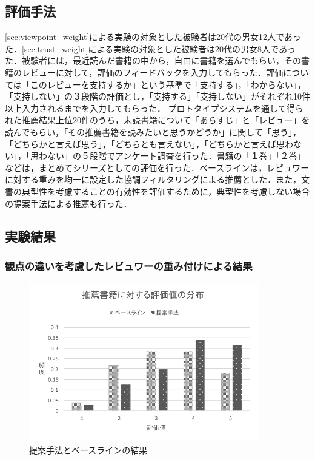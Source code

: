 \documentclass[a4paper,11pt,oneside,openany]{jsbook}
\begin{document}
		\subsection{評価手法}
\ref{sec:viewpoint_weight}による実験の対象とした被験者は20代の男女12人であった．\ref{sec:trust_weight}による実験の対象とした被験者は20代の男女8人であった．被験者には，最近読んだ書籍の中から，自由に書籍を選んでもらい，その書籍のレビューに対して，評価のフィードバックを入力してもらった．評価については「このレビューを支持するか」という基準で「支持する」，「わからない」，「支持しない」の３段階の評価とし，「支持する」「支持しない」がそれぞれ10件以上入力されるまでを入力してもらった．
プロトタイプシステムを通して得られた推薦結果上位20件のうち，未読書籍について「あらすじ」と「レビュー」を読んでもらい，「その推薦書籍を読みたいと思うかどうか」に関して「思う」，「どちらかと言えば思う」，「どちらとも言えない」，「どちらかと言えば思わない」，「思わない」の５段階でアンケート調査を行った．書籍の「１巻」「２巻」などは，まとめてシリーズとしての評価を行った．ベースラインは，レビュワーに対する重みを均一に設定した協調フィルタリングによる推薦とした．また，文書の典型性を考慮することの有効性を評価するために，典型性を考慮しない場合の提案手法による推薦も行った．
		\subsection{実験結果}
		\subsubsection{観点の違いを考慮したレビュワーの重み付けによる結果}
\begin{figure}[tb]
	\begin{center} %
		\includegraphics [width =100mm] {figures/result_topic.pdf} %
	\end{center}
	\caption{提案手法とベースラインの結果} %
	\label{fig:result1} %
\end{figure}
\end{document}
